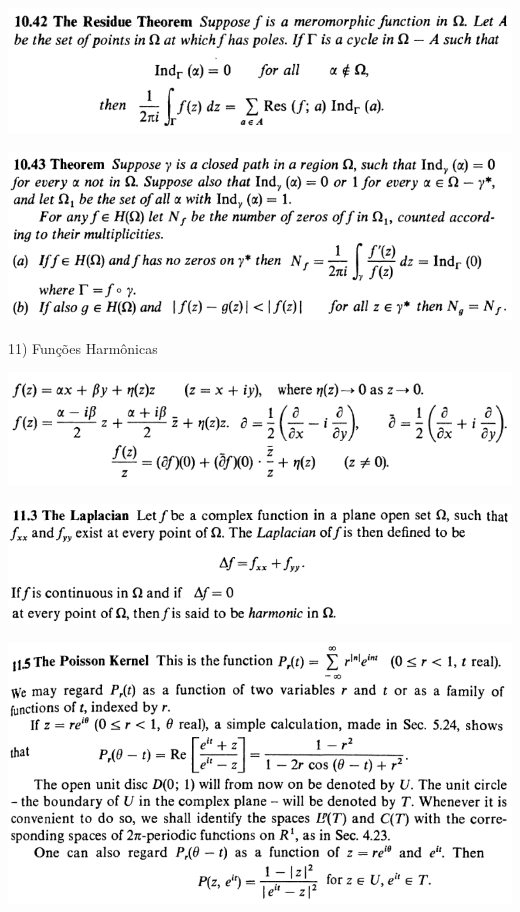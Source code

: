 \documentclass[12pt]{article}
\begin{document}
		\begin{center}
		\includegraphics{10ponto42}
		\end{center}

		\begin{center}
		\includegraphics{10ponto43}
		\end{center}

\vspace{3mm}

11) Fun\c{c}\~oes Harm\^onicas

\vspace{3mm}

		\begin{center}
		\includegraphics{d11ponto1}
		\end{center}

		\begin{center}
		\includegraphics[scale=0.9]{d11ponto3}
		\end{center}

		\begin{center}
		\includegraphics[scale=0.9]{d11ponto5}
		\end{center}
\end{document}
